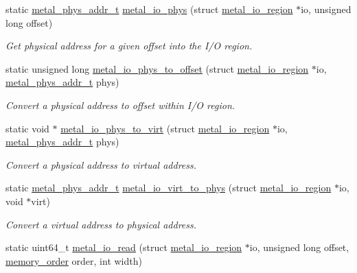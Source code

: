 \begin{DoxyCompactItemize}
static \hyperlink{group__system_gae024fa10b72199a3e26c29b6eb97df5d}{metal\+\_\+phys\+\_\+addr\+\_\+t} \hyperlink{group__io_gaa5bd9046501972a98ddf3523a9a6496c}{metal\+\_\+io\+\_\+phys} (struct \hyperlink{structmetal__io__region}{metal\+\_\+io\+\_\+region} $\ast$io, unsigned long offset)
\begin{DoxyCompactList}\small\item\em Get physical address for a given offset into the I/O region. \end{DoxyCompactList}\item 
static unsigned long \hyperlink{group__io_gab05b89cd7c46c0011f81a491cdf218aa}{metal\+\_\+io\+\_\+phys\+\_\+to\+\_\+offset} (struct \hyperlink{structmetal__io__region}{metal\+\_\+io\+\_\+region} $\ast$io, \hyperlink{group__system_gae024fa10b72199a3e26c29b6eb97df5d}{metal\+\_\+phys\+\_\+addr\+\_\+t} phys)
\begin{DoxyCompactList}\small\item\em Convert a physical address to offset within I/O region. \end{DoxyCompactList}\item 
static void $\ast$ \hyperlink{group__io_ga45cdfe51e59923abefb2c26a0e1daff0}{metal\+\_\+io\+\_\+phys\+\_\+to\+\_\+virt} (struct \hyperlink{structmetal__io__region}{metal\+\_\+io\+\_\+region} $\ast$io, \hyperlink{group__system_gae024fa10b72199a3e26c29b6eb97df5d}{metal\+\_\+phys\+\_\+addr\+\_\+t} phys)
\begin{DoxyCompactList}\small\item\em Convert a physical address to virtual address. \end{DoxyCompactList}\item 
static \hyperlink{group__system_gae024fa10b72199a3e26c29b6eb97df5d}{metal\+\_\+phys\+\_\+addr\+\_\+t} \hyperlink{group__io_ga64cde67e877ed73aac9cb2eed11b67b0}{metal\+\_\+io\+\_\+virt\+\_\+to\+\_\+phys} (struct \hyperlink{structmetal__io__region}{metal\+\_\+io\+\_\+region} $\ast$io, void $\ast$virt)
\begin{DoxyCompactList}\small\item\em Convert a virtual address to physical address. \end{DoxyCompactList}\item 
static uint64\+\_\+t \hyperlink{group__io_ga0cd8707fcac0d892726f1e946186c531}{metal\+\_\+io\+\_\+read} (struct \hyperlink{structmetal__io__region}{metal\+\_\+io\+\_\+region} $\ast$io, unsigned long offset, \hyperlink{compiler_2gcc_2atomic_8h_a17c2de5ae768960284c047a320f17d1b}{memory\+\_\+order} order, int width)

\end{DoxyCompactItemize}
